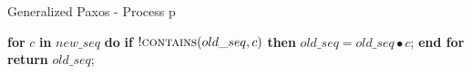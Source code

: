 \begin{algorithm}
\caption{Generalized Paxos - Process p}
\begin{algorithmic}[1]
	
	\State \textbf{for} $c$ \textbf{in} $new\_seq$ \textbf{do} 
	\State \hspace{\algorithmicindent} \textbf{if} $!\Call{contains}{old\_seq,c}$ \textbf{then}
	\State \hspace{\algorithmicindent}\hspace{\algorithmicindent}\hspace{\algorithmicindent} $old\_seq =  old\_seq \bullet c$;
	\State \textbf{end for}
	\State \textbf{return} $old\_seq$;
	\EndFunction
\end{algorithmic}
\end{algorithm}

